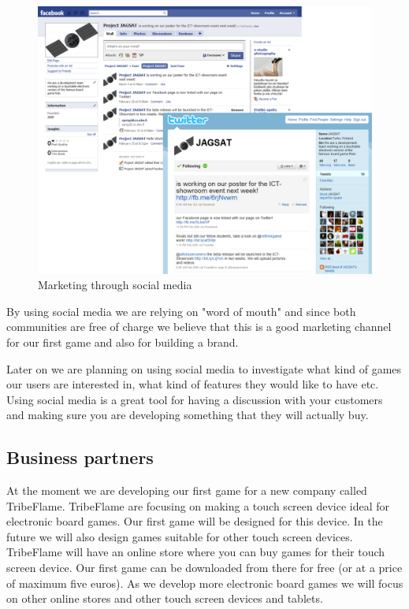\documentclass[12pt,a4paper]{article}
\begin{document}
\begin{figure}[H]
  \centering
  \includegraphics[width=12cm]{pic/bplan_01.pdf}
  \caption{Marketing through social media}
  \label{fig:mark}
\end{figure}

By using social media we are relying on "word of mouth" and since both communities are free of charge we believe that this is a good marketing channel for our first game and also for building a brand.

Later on we are planning on using social media to investigate what kind of games our users are interested in, what kind of features they would like to have etc. Using social media is a great tool for having a discussion with your customers and making sure you are developing something that they will actually buy.

\subsection{Business partners}
At the moment we are developing our first game for a new company called TribeFlame. TribeFlame are focusing on making a touch screen device ideal for electronic board games. Our first game will be designed for this device. In the future we will also design games suitable for other touch screen devices. TribeFlame will have an online store where you can buy games for their touch screen device. Our first game can be downloaded from there for free (or at a price of maximum five euros). As we develop more electronic board games we will focus on other online stores and other touch screen devices and tablets.
\end{document}

